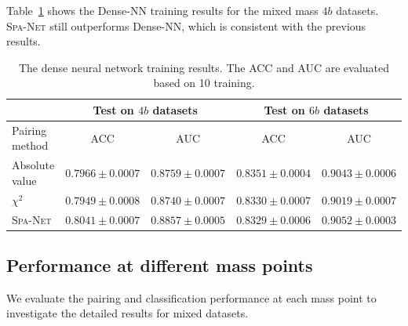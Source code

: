 \documentclass[12pt]{article}
\begin{document}
        Table~\ref{tab:DNN_training_results_mix_1M_4b-TRSM} shows the Dense-NN training results for the mixed mass $4b$ datasets. \textsc{Spa-Net} still outperforms Dense-NN, which is consistent with the previous results.
        \begin{table}[htpb]
            \centering
            \caption{The dense neural network training results. The ACC and AUC are evaluated based on 10 training.}
            \label{tab:DNN_training_results_mix_1M_4b-TRSM}
            \begin{tabular}{l|cc|cc}
                             & \multicolumn{2}{c|}{Test on $4b$ datasets}& \multicolumn{2}{c}{Test on $6b$ datasets} \\ \hline
            Pairing method   & ACC                 & AUC                 & ACC                 & AUC                 \\ \hline
            Absolute value   & $0.7966 \pm 0.0007$ & $0.8759 \pm 0.0007$ & $0.8351 \pm 0.0004$ & $0.9043 \pm 0.0006$ \\
            $\chi^2$         & $0.7949 \pm 0.0008$ & $0.8740 \pm 0.0007$ & $0.8330 \pm 0.0007$ & $0.9019 \pm 0.0007$ \\
            \textsc{Spa-Net} & $0.8041 \pm 0.0007$ & $0.8857 \pm 0.0005$ & $0.8329 \pm 0.0006$ & $0.9052 \pm 0.0003$
            \end{tabular}
        \end{table}
    \subsection{Performance at different mass points}%
    \label{sub:performance_at_different_mass_points}
        We evaluate the pairing and classification performance at each mass point to investigate the detailed results for mixed datasets.
\end{document}
